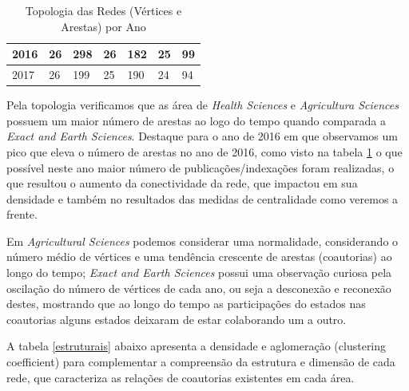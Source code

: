 \begin{table}[H]
\begin{tabular}{lllllll}
		\multicolumn{1}{|l|}{2016}                                  & \multicolumn{1}{l|}{26}                                        & \multicolumn{1}{l|}{298}                                      & \multicolumn{1}{l|}{26}                                        & \multicolumn{1}{l|}{182}                                      & \multicolumn{1}{l|}{25}                                        & \multicolumn{1}{l|}{99}                                       \\ \hline
		\multicolumn{1}{|l|}{2017}                                  & \multicolumn{1}{l|}{26}                                        & \multicolumn{1}{l|}{199}                                      & \multicolumn{1}{l|}{25}                                        & \multicolumn{1}{l|}{190}                                      & \multicolumn{1}{l|}{24}                                        & \multicolumn{1}{l|}{94}                                       \\ \hline
	\end{tabular}
\label{nos-arestas-todos}
\caption{Topologia das Redes (Vértices e Arestas) por Ano}
\end{table}


Pela topologia verificamos que as área de \textit{Health Sciences} e \textit{Agricultura Sciences} possuem um maior número de arestas ao logo do tempo quando comparada a \textit{Exact and Earth Sciences}. Destaque para o ano de 2016 em que observamos um pico que eleva o número de arestas no ano de 2016, como visto na tabela \ref{nos-arestas-todos} o que possível neste ano maior número de publicações/indexações foram realizadas, o que resultou o aumento da conectividade da rede, que impactou em sua densidade e também no resultados das medidas de centralidade como veremos a frente. 

Em \textit{Agricultural Sciences} podemos considerar uma normalidade, considerando o número médio de vértices e uma tendência crescente de arestas (coautorias) ao longo do tempo; \textit{Exact and Earth Sciences} possui uma observação curiosa pela oscilação do número de vértices de cada ano, ou seja a desconexão e reconexão destes, mostrando que ao longo do tempo as participações do estados nas coautorias alguns estados deixaram de estar colaborando um a outro.

A tabela \ref{estruturais} abaixo apresenta a densidade e aglomeração (clustering coefficient) para complementar a compreensão da estrutura e dimensão de cada rede, que caracteriza as relações de coautorias existentes em cada área.


